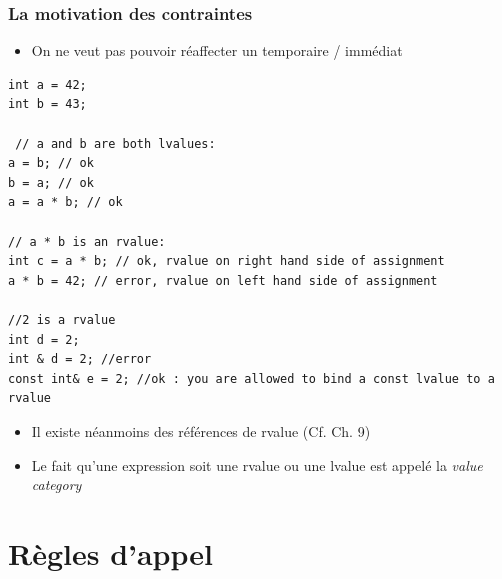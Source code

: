 \begin{frame}[containsverbatim]
\frametitle{La motivation des contraintes}
\begin{itemize}
\item On ne veut pas pouvoir réaffecter un temporaire / immédiat
\end{itemize}
\begin{lstlisting}
int a = 42;
int b = 43;

 // a and b are both lvalues:
a = b; // ok
b = a; // ok
a = a * b; // ok

// a * b is an rvalue:
int c = a * b; // ok, rvalue on right hand side of assignment
a * b = 42; // error, rvalue on left hand side of assignment

//2 is a rvalue
int d = 2;
int & d = 2; //error
const int& e = 2; //ok : you are allowed to bind a const lvalue to a rvalue
\end{lstlisting}
\begin{itemize}
\item Il existe néanmoins des références de rvalue (Cf. Ch. 9)
\item Le fait qu'une expression soit une rvalue ou une lvalue est appelé la \emph{value category}
\end{itemize}
\end{frame}

\section{Règles d'appel}

